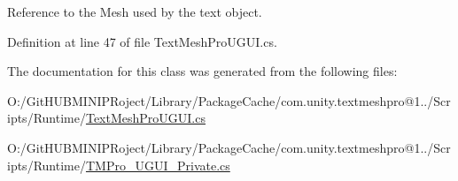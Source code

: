Reference to the Mesh used by the text object. 



Definition at line 47 of file Text\+Mesh\+Pro\+U\+G\+U\+I.\+cs.



The documentation for this class was generated from the following files\+:\begin{DoxyCompactItemize}
\item 
O\+:/\+Git\+H\+U\+B\+M\+I\+N\+I\+P\+Roject/\+Library/\+Package\+Cache/com.\+unity.\+textmeshpro@1../\+Scripts/\+Runtime/\mbox{\hyperlink{_text_mesh_pro_u_g_u_i_8cs}{Text\+Mesh\+Pro\+U\+G\+U\+I.\+cs}}\item 
O\+:/\+Git\+H\+U\+B\+M\+I\+N\+I\+P\+Roject/\+Library/\+Package\+Cache/com.\+unity.\+textmeshpro@1../\+Scripts/\+Runtime/\mbox{\hyperlink{_t_m_pro___u_g_u_i___private_8cs}{T\+M\+Pro\+\_\+\+U\+G\+U\+I\+\_\+\+Private.\+cs}}\end{DoxyCompactItemize}
